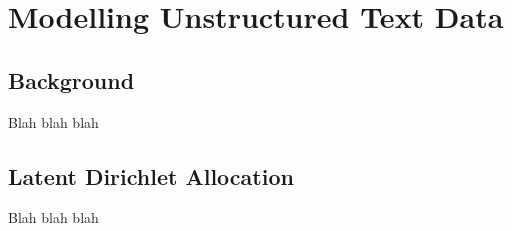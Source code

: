 \chapter{Modelling Unstructured Text Data}\label{ch:TopicModelling}

\section{Background}

Blah blah blah

\section{Latent Dirichlet Allocation}\label{sec:LDA}

Blah blah blah
